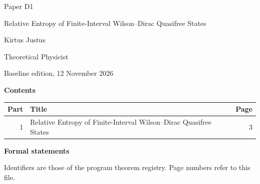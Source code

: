 \documentclass[11pt,a4paper]{article}
\begin{document}
\thispagestyle{empty}\pagestyle{empty}
{\small\sffamily \ProgramTitle\hfill Paper D1\par}
\vspace*{12mm}
{\LARGE\bfseries\raggedright{} Relative Entropy of Finite-Interval Wilson–Dirac Quasifree States\par}
\vspace{9mm}
{\large Kirtus Justus\par}\vspace{1mm}Theoretical Physicist\par\AuthorLocation\par\vspace{2mm}Baseline edition, 12 November 2026\par\vspace{8mm}
\textbf{Contents}\par\vspace{1mm}
{\small\begin{longtable}{@{}r>{\raggedright\arraybackslash}p{}r@{}}
\toprule Part & Title & Page\\\midrule\endhead
1 & Relative Entropy of Finite-Interval Wilson–Dirac Quasifree States & 3\\
\bottomrule\end{longtable}}
\vspace{2mm}\textbf{Formal statements}\par\vspace{1mm}
{\footnotesize Identifiers are those of the program theorem registry. Page numbers refer to this file.\par}
\end{document}
